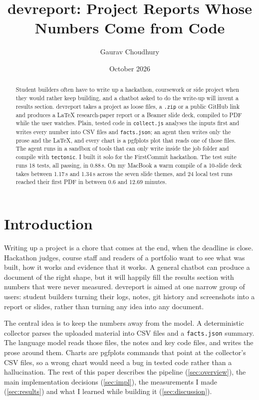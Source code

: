 \documentclass[11pt]{article}
\title{devreport: Project Reports Whose Numbers Come from Code}
\author{Gaurav Choudhury}
\date{October 2026}
\begin{document}
\maketitle

\begin{abstract}
Student builders often have to write up a hackathon, coursework or side project when they would rather keep building, and a chatbot asked to do the write-up will invent a results section. devreport takes a project as loose files, a \texttt{.zip} or a public GitHub link and produces a LaTeX research-paper report or a Beamer slide deck, compiled to PDF while the user watches. Plain, tested code in \texttt{collect.js} analyses the inputs first and writes every number into CSV files and \texttt{facts.json}; an agent then writes only the prose and the LaTeX, and every chart is a pgfplots plot that reads one of those files. The agent runs in a sandbox of tools that can only write inside the job folder and compile with \texttt{tectonic}. I built it solo for the FirstCommit hackathon. The test suite runs 18 tests, all passing, in 0.88\,s. On my MacBook a warm compile of a 10-slide deck takes between 1.17\,s and 1.34\,s across the seven slide themes, and 24 local test runs reached their first PDF in between 0.6 and 12.69 minutes.
\end{abstract}

\section{Introduction}

Writing up a project is a chore that comes at the end, when the deadline is close. Hackathon judges, course staff and readers of a portfolio want to see what was built, how it works and evidence that it works. A general chatbot can produce a document of the right shape, but it will happily fill the results section with numbers that were never measured. devreport is aimed at one narrow group of users: student builders turning their logs, notes, git history and screenshots into a report or slides, rather than turning any idea into any document.

The central idea is to keep the numbers away from the model. A deterministic collector parses the uploaded material into CSV files and a \texttt{facts.json} summary. The language model reads those files, the notes and key code files, and writes the prose around them. Charts are pgfplots commands that point at the collector's CSV files, so a wrong chart would need a bug in tested code rather than a hallucination. The rest of this paper describes the pipeline (\autoref{sec:overview}), the main implementation decisions (\autoref{sec:impl}), the measurements I made (\autoref{sec:results}) and what I learned while building it (\autoref{sec:discussion}).
\end{document}
